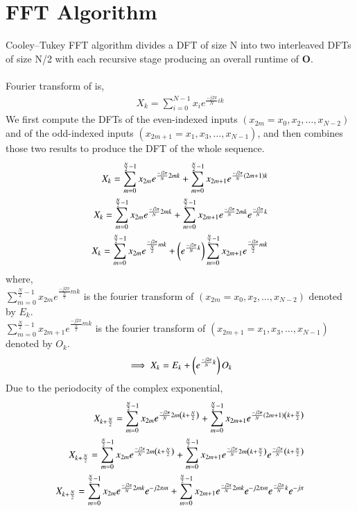 \documentclass[journal,12pt,twocolumn]{IEEEtran}
\begin{document}
\section{FFT Algorithm}
Cooley–Tukey FFT algorithm divides a DFT of size N into two interleaved DFTs of size N/2 with each recursive stage producing an overall runtime of \textbf{O}.
\\
\\
Fourier transform of  is,
\begin{align}
     X_{k} = \sum _{i=0}^{N-1}x_{i}e^{\frac{-j2\pi}{N}ik}
\end{align}
We first compute the DFTs of the even-indexed inputs  $(x_{2m}=x_{0},x_{2},\ldots ,x_{N-2})$ and of the odd-indexed inputs $(x_{2m+1}=x_{1},x_{3},\ldots ,x_{N-1})$, and then combines those two results to produce the DFT of the whole sequence.
\begin{align}
     X_{k} = \sum _{m=0}^{\frac{N}{2}-1}x_{2m}e^{\frac{-j2\pi}{N}2mk} + \sum _{m=0}^{\frac{N}{2}-1}x_{2m+1}e^{\frac{-j2\pi}{N}(2m+1)k}
     \\
     X_{k} = \sum _{m=0}^{\frac{N}{2}-1}x_{2m}e^{\frac{-j2\pi}{N}2mk} + \sum _{m=0}^{\frac{N}{2}-1}x_{2m+1}e^{\frac{-j2\pi}{N}2mk} e^{\frac{-j2\pi}{N}k}
     \\
     X_{k} = \sum _{m=0}^{\frac{N}{2}-1}x_{2m}e^{\frac{-j2\pi}{\frac{N}{2}}mk} + \left( e^{\frac{-j2\pi}{N}k}\right)\sum _{m=0}^{\frac{N}{2}-1}x_{2m+1}e^{\frac{-j2\pi}{\frac{N}{2}}mk}
\end{align}
where,
\\
$\sum_{m=0}^{\frac{N}{2}-1}x_{2m}e^{\frac{-j2\pi}{\frac{N}{2}}mk}$ is the fourier transform of $(x_{2m}=x_{0},x_{2},\ldots ,x_{N-2})$ denoted by $E_{k}$.
\\
$\sum_{m=0}^{\frac{N}{2}-1}x_{2m+1}e^{\frac{-j2\pi}{\frac{N}{2}}mk}$ is the fourier transform of $(x_{2m+1}=x_{1},x_{3},\ldots ,x_{N-1})$ denoted by $O_{k}$.
\begin{align}
\implies X_{k} = E_{k} + \left( e^{\frac{-j2\pi}{N}k}\right)O_{k}
\end{align}
Due to the periodocity of the complex exponential,
\begin{align}
     X_{k+\frac{N}{2}} = \sum _{m=0}^{\frac{N}{2}-1}x_{2m}e^{\frac{-j2\pi}{N}2m\left(k+\frac{N}{2}\right)} + \sum _{m=0}^{\frac{N}{2}-1}x_{2m+1}e^{\frac{-j2\pi}{N}(2m+1)\left(k+\frac{N}{2}\right)}
     \\
     X_{k+\frac{N}{2}} = \sum _{m=0}^{\frac{N}{2}-1}x_{2m}e^{\frac{-j2\pi}{N}2m\left(k+\frac{N}{2}\right)} + \sum _{m=0}^{\frac{N}{2}-1}x_{2m+1}e^{\frac{-j2\pi}{N}2m\left(k+\frac{N}{2}\right)} e^{\frac{-j2\pi}{N}\left(k+\frac{N}{2}\right)}
     \\
     X_{k+\frac{N}{2}} = \sum _{m=0}^{\frac{N}{2}-1}x_{2m}e^{\frac{-j2\pi}{N}2mk}e^{-j2\pi m} + \sum _{m=0}^{\frac{N}{2}-1}x_{2m+1}e^{\frac{-j2\pi}{N}2mk}e^{-j2\pi m} e^{\frac{-j2\pi}{N}k}e^{-j\pi}
\end{align}
\end{document}
